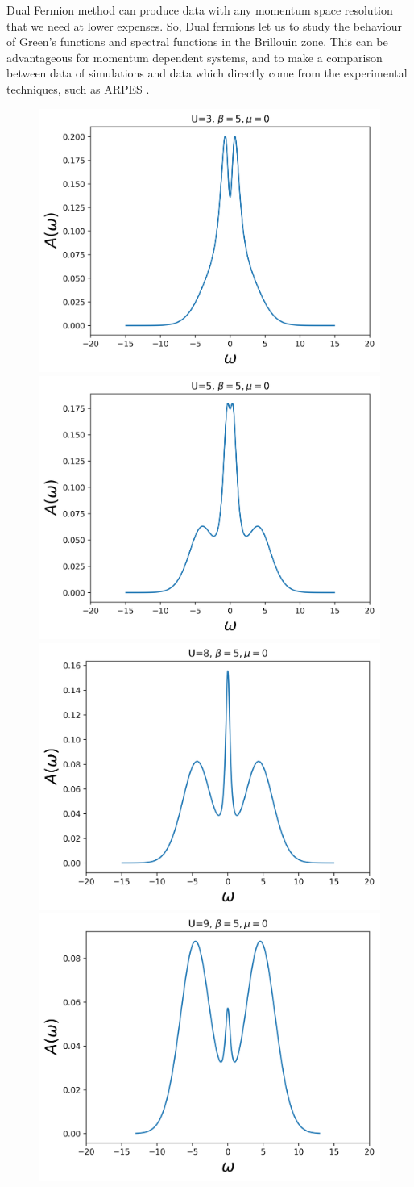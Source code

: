 Dual Fermion method can produce data with any momentum space resolution that we need at lower expenses. So, Dual fermions let us to study the behaviour of Green's functions and spectral functions in the Brillouin zone. This can be advantageous for momentum dependent systems, and to make a comparison between data of simulations and data which directly come from the experimental techniques, such as ARPES \cite{Zahid}.


\begin{figure}[ht]
\centering
    \includegraphics[width=0.45\linewidth]{fig2/spectral3.png}
     \includegraphics[width=0.45\linewidth]{fig2/spectral5.png}
      \includegraphics[width=0.45\linewidth]{fig2/spectral8.png}
       \includegraphics[width=0.45\linewidth]{fig2/spectral9.png}

\end{figure}
